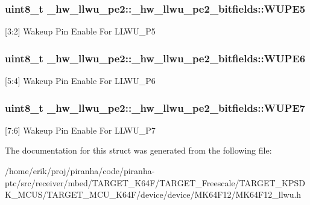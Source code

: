 \subsubsection[{\texorpdfstring{W\+U\+P\+E5}{WUPE5}}]{\setlength{\rightskip}{0pt plus 5cm}uint8\+\_\+t \+\_\+hw\+\_\+llwu\+\_\+pe2\+::\+\_\+hw\+\_\+llwu\+\_\+pe2\+\_\+bitfields\+::\+W\+U\+P\+E5}\hypertarget{struct__hw__llwu__pe2_1_1__hw__llwu__pe2__bitfields_a956f50db922f189891bd03057e07fb66}{}\label{struct__hw__llwu__pe2_1_1__hw__llwu__pe2__bitfields_a956f50db922f189891bd03057e07fb66}
\mbox{[}3\+:2\mbox{]} Wakeup Pin Enable For L\+L\+W\+U\+\_\+\+P5 
\subsubsection[{\texorpdfstring{W\+U\+P\+E6}{WUPE6}}]{\setlength{\rightskip}{0pt plus 5cm}uint8\+\_\+t \+\_\+hw\+\_\+llwu\+\_\+pe2\+::\+\_\+hw\+\_\+llwu\+\_\+pe2\+\_\+bitfields\+::\+W\+U\+P\+E6}\hypertarget{struct__hw__llwu__pe2_1_1__hw__llwu__pe2__bitfields_a9bc4fa718569c0296c4655166e0a21d8}{}\label{struct__hw__llwu__pe2_1_1__hw__llwu__pe2__bitfields_a9bc4fa718569c0296c4655166e0a21d8}
\mbox{[}5\+:4\mbox{]} Wakeup Pin Enable For L\+L\+W\+U\+\_\+\+P6 
\subsubsection[{\texorpdfstring{W\+U\+P\+E7}{WUPE7}}]{\setlength{\rightskip}{0pt plus 5cm}uint8\+\_\+t \+\_\+hw\+\_\+llwu\+\_\+pe2\+::\+\_\+hw\+\_\+llwu\+\_\+pe2\+\_\+bitfields\+::\+W\+U\+P\+E7}\hypertarget{struct__hw__llwu__pe2_1_1__hw__llwu__pe2__bitfields_a130e2de1f0ce3c3dd2dc34b101518b85}{}\label{struct__hw__llwu__pe2_1_1__hw__llwu__pe2__bitfields_a130e2de1f0ce3c3dd2dc34b101518b85}
\mbox{[}7\+:6\mbox{]} Wakeup Pin Enable For L\+L\+W\+U\+\_\+\+P7 

The documentation for this struct was generated from the following file\+:\begin{DoxyCompactItemize}
\item 
/home/erik/proj/piranha/code/piranha-\/ptc/src/receiver/mbed/\+T\+A\+R\+G\+E\+T\+\_\+\+K64\+F/\+T\+A\+R\+G\+E\+T\+\_\+\+Freescale/\+T\+A\+R\+G\+E\+T\+\_\+\+K\+P\+S\+D\+K\+\_\+\+M\+C\+U\+S/\+T\+A\+R\+G\+E\+T\+\_\+\+M\+C\+U\+\_\+\+K64\+F/device/device/\+M\+K64\+F12/M\+K64\+F12\+\_\+llwu.\+h\end{DoxyCompactItemize}
